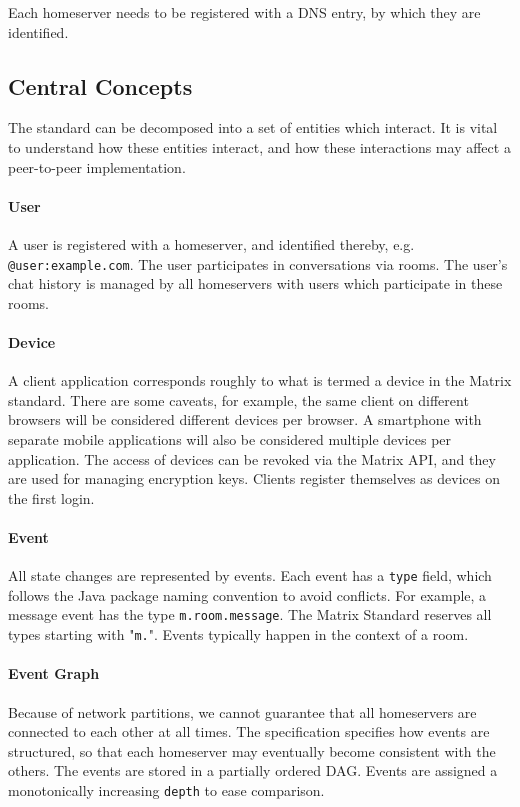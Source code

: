 Each homeserver needs to be registered with a \ac{DNS} entry, by which they are identified.

\subsection{Central Concepts}
The standard can be decomposed into a set of entities which interact.
It is vital to understand how these entities interact, and how these interactions may affect a peer-to-peer implementation.

\paragraph{User}
A user is registered with a homeserver, and identified thereby, e.g. \texttt{@user:example.com}.
The user participates in conversations via rooms.
The user's chat history is managed by all homeservers with users which participate in these rooms.

\paragraph{Device}
A client application corresponds roughly to what is termed a device in the Matrix standard.
There are some caveats, for example, the same client on different browsers will be considered different devices per browser.
A smartphone with separate mobile applications will also be considered multiple devices per application.
The access of devices can be revoked via the Matrix \ac{API}, and they are used for managing encryption keys.
Clients register themselves as devices on the first login.

\paragraph{Event}
All state changes are represented by events.
Each event has a \texttt{type} field, which follows the Java package naming convention to avoid conflicts.
For example, a message event has the type \texttt{m.room.message}.
The Matrix Standard reserves all types starting with "\texttt{m.}".
Events typically happen in the context of a room.

\paragraph{Event Graph}
Because of network partitions, we cannot guarantee that all homeservers are connected to each other at all times.
The specification specifies how events are structured, so that each homeserver may eventually become consistent with the others.
The events are stored in a partially ordered \ac{DAG}.
Events are assigned a monotonically increasing \texttt{depth} to ease comparison.

